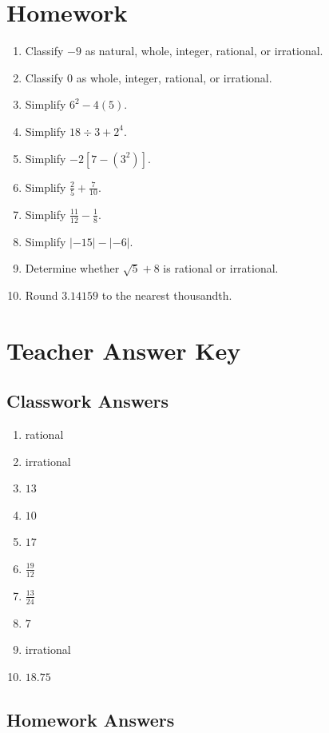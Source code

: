 \documentclass[11pt]{book}
\begin{document}
\section{Homework}

\begin{enumerate}
\item Classify \(-9\) as natural, whole, integer, rational, or irrational.
\item Classify \(0\) as whole, integer, rational, or irrational.
\item Simplify \(6^2-4(5)\).
\item Simplify \(18\div3+2^4\).
\item Simplify \(-2[7-(3^2)]\).
\item Simplify \(\frac{2}{5}+\frac{7}{10}\).
\item Simplify \(\frac{11}{12}-\frac{1}{8}\).
\item Simplify \(|-15|-|-6|\).
\item Determine whether \(\sqrt5+8\) is rational or irrational.
\item Round \(3.14159\) to the nearest thousandth.
\end{enumerate}

\section{Teacher Answer Key}

\subsection{Classwork Answers}

\begin{enumerate}
\item rational
\item irrational
\item \(13\)
\item \(10\)
\item \(17\)
\item \(\frac{19}{12}\)
\item \(\frac{13}{24}\)
\item \(7\)
\item irrational
\item \(18.75\)
\end{enumerate}

\subsection{Homework Answers}
\end{document}
